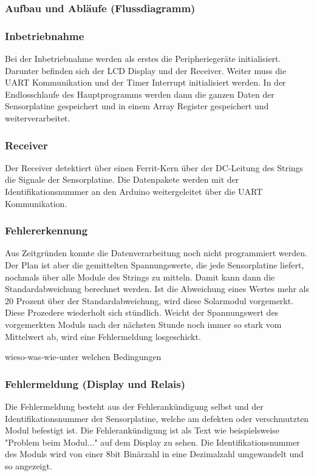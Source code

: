 \subsubsection{Aufbau und Abläufe (Flussdiagramm)}
\subsubsection{Inbetriebnahme}
Bei der Inbetriebnahme werden als erstes die Peripheriegeräte initialisiert. Darunter befinden sich der LCD Display und der Receiver. Weiter muss die UART Kommunikation und der Timer Interrupt initialisiert werden. In der Endlosschlaufe des Hauptprogramms werden dann die ganzen Daten der Sensorplatine gespeichert und in einem Array Register gespeichert und weiterverarbeitet.

\subsubsection{Receiver}
Der Receiver detektiert über einen Ferrit-Kern über der DC-Leitung des Strings die Signale der Sensorplatine. Die Datenpakete werden mit der Identifikationsnummer an den Arduino weitergeleitet über die UART Kommunikation.

\subsubsection{Fehlererkennung}
Aus Zeitgründen konnte die Datenverarbeitung noch nicht programmiert werden. Der Plan ist aber die gemittelten Spannungswerte, die jede Sensorplatine liefert, nochmals über alle Module des Strings zu mitteln. Damit kann dann die Standardabweichung berechnet werden. Ist die Abweichung eines Wertes mehr als 20 Prozent über der Standardabweichung, wird diese Solarmodul vorgemerkt. Diese Prozedere wiederholt sich stündlich. Weicht der Spannungswert des vorgemerkten Moduls nach der nächsten Stunde noch immer so stark vom Mittelwert ab, wird eine Fehlermeldung losgeschickt.

wieso-was-wie-unter welchen Bedingungen
\subsubsection{Fehlermeldung (Display und Relais)}
Die Fehlermeldung besteht aus der Fehlerankündigung selbst und der Identifikationsnummer der Sensorplatine, welche am defekten oder verschmutzten Modul befestigt ist. Die Fehlerankündigung ist als Text wie beispielsweise "Problem beim Modul..." auf dem Display zu sehen. Die Identifikationsnummer des Moduls wird von einer 8bit Binärzahl in eine Dezimalzahl umgewandelt und so angezeigt.

